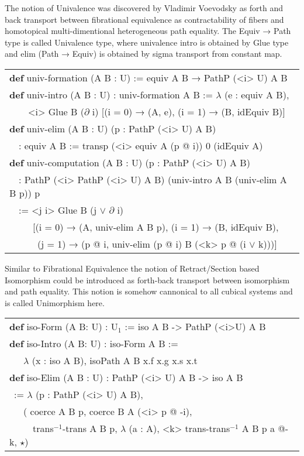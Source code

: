 \documentclass[a4paper,UKenglish,cleveref, autoref, thm-restate]{lipics-v2021}
\newcommand{\tabstyle}[0]{\scriptsize\ttfamily\fontseries{l}\selectfont}
\begin{document}
The notion of Univalence was discovered by Vladimir Voevodsky
as forth and back transport between fibrational equivalence
as contractability of fibers and homotopical multi-dimentional
heterogeneous path equality. The Equiv → Path type is called Univalence type,
where univalence intro is obtained by Glue type and elim (Path → Equiv) is
obtained by sigma transport from constant map.

\begin{table}[ht]
\tabstyle
\begin{tabular}{l}
\textbf{def} univ-formation (A B : U) := equiv A B → PathP (<i> U) A B \\
\textbf{def} univ-intro (A B : U) : univ-formation A B := $\lambda$ (e : equiv A B), \\
\ \ \ \ <i> Glue B ($\partial$ i) [(i = 0) → (A, e), (i = 1) → (B, idEquiv B)] \\
\textbf{def} univ-elim (A B : U) (p : PathP (<i> U) A B) \\
\ \ : equiv A B := transp (<i> equiv A (p @ i)) 0 (idEquiv A) \\
\textbf{def} univ-computation (A B : U) (p : PathP (<i> U) A B) \\
\ \ : PathP (<i> PathP (<i> U) A B) (univ-intro A B (univ-elim A B p)) p \\
\ \ := <j i> Glue B (j $\vee$ $\partial$ i) \\
\ \ \ \ \ [(i = 0) → (A, univ-elim A B p), (i = 1) → (B, idEquiv B), \\
\ \ \ \ \ \ (j = 1) → (p @ i, univ-elim (p @ i) B (<k> p @ (i $\vee$ k)))] \\
\end{tabular}
\end{table}

Similar to Fibrational Equivalence the notion of Retract/Section based Isomorphism could be introduced
as forth-back transport between isomorphism and path equality. This notion is somehow cannonical to all
cubical systems and is called Unimorphism here.

\begin{table}[ht!]
\tabstyle
\begin{tabular}{l}
\textbf{def} iso-Form (A B: U) : U$_1$ := iso A B -> PathP (<i>U) A B \\
\textbf{def} iso-Intro (A B: U) : iso-Form A B := \\
\ \ \ $\lambda$ (x : iso A B), isoPath A B x.f x.g x.s x.t \\
\textbf{def} iso-Elim (A B : U) : PathP (<i> U) A B -> iso A B \\
\ := $\lambda$ (p : PathP (<i> U) A B), \\
\ \ \ ( coerce A B p, coerce B A (<i> p @ -i), \\
\ \ \ \ \ trans$^{-1}$-trans A B p, $\lambda$ (a : A), <k> trans-trans$^{-1}$ A B p a @-k, $\star$) \\
\end{tabular}
\end{table}
\end{document}
